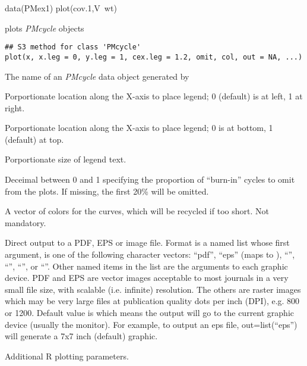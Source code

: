 \documentclass[a4paper]{book}
\begin{document}
%
\begin{Examples}
\begin{ExampleCode}
data(PMex1)
plot(cov.1,V~wt)
\end{ExampleCode}
\end{Examples}
%
\begin{Description}\relax
{} plots \emph{PMcycle} objects
\end{Description}
%
\begin{Usage}
\begin{verbatim}
## S3 method for class 'PMcycle'
plot(x, x.leg = 0, y.leg = 1, cex.leg = 1.2, omit, col, out = NA, ...)
\end{verbatim}
\end{Usage}
%
\begin{Arguments}
\begin{ldescription}
\item[\code{x}] The name of an \emph{PMcycle} data object generated by 

\item[\code{x.leg}] Porportionate location along the X-axis to place legend; 0 (default) is at left, 1 at right.

\item[\code{y.leg}] Porportionate location along the X-axis to place legend;  0 is at bottom, 1 (default) at top.

\item[\code{cex.leg}] Porportionate size of legend text.

\item[\code{omit}] Deceimal between 0 and 1 specifying the proportion of ``burn-in'' cycles to omit from the plots.  If missing,
the first 20\% will be omitted.

\item[\code{col}] A vector of colors for the curves, which will be recycled if too short.  Not mandatory.

\item[\code{out}] Direct output to a PDF, EPS or image file.  Format is a named list whose first argument, 
 is one of the following character vectors: ``pdf'', ``eps'' (maps to ),
``'', ``'', ``'', or ``''.  Other named items in the list
are the arguments to each graphic device. PDF and EPS are vector images acceptable to most journals
in a very small file size, with scalable (i.e. infinite) resolution.  The others are raster images which may be very
large files at publication quality dots per inch (DPI), e.g. 800 or 1200. Default value is  which means the 
output will go to the current graphic device (usually the monitor). For example, to output an eps file,
out=list(``eps'') will generate a 7x7 inch (default) graphic.

\item[\code{...}] Additional R plotting parameters.
\end{ldescription}
\end{Arguments}
\end{document}
